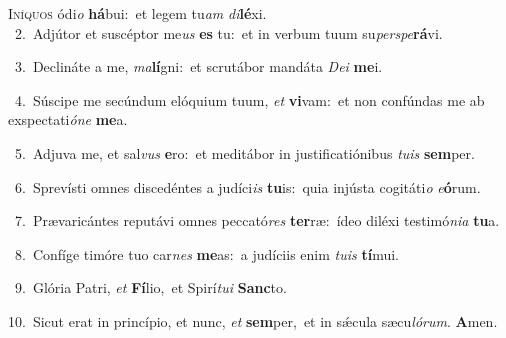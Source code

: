 \lettrine{\initial\textcolor{\initialcolor}{I}}{níquos} ódi\textit{o} \textbf{há}\-bui:~\star et legem tu\textit{am} \textit{di}\-\textbf{lé}xi.\\
{\numbfont\textcolor{\numbcolor}{~2.}}~Adjútor et suscéptor me\textit{us} \textbf{es} tu:~\star et in verbum tuum su\-\textit{per}\-\textit{spe}\textbf{rá}vi.\par
{\numbfont\textcolor{\numbcolor}{~3.}}~Declináte a me, \textit{ma}\-\textbf{lí}gni:~\star et scrutábor mandáta \textit{De}\-\textit{i} \textbf{me}\-i.\par
{\numbfont\textcolor{\numbcolor}{~4.}}~Súscipe me secúndum elóquium tuum, \textit{et} \textbf{vi}\-vam:~\star et non confúndas me ab exspectati\-\textit{ó}\-\textit{ne} \textbf{me}\-a.\par
{\numbfont\textcolor{\numbcolor}{~5.}}~Adjuva me, et sal\textit{vus} \textbf{e}\-ro:~\star et meditábor in justificatiónibus \textit{tu}\-\textit{is} \textbf{sem}\-per.\par
{\numbfont\textcolor{\numbcolor}{~6.}}~Sprevísti omnes discedéntes a judíci\textit{is} \textbf{tu}\-is:~\star quia injústa cogitáti\textit{o} \textit{e}\-\textbf{ó}rum.\par
{\numbfont\textcolor{\numbcolor}{~7.}}~Prævaricántes reputávi omnes peccató\textit{res} \textbf{ter}\-ræ:~\star ídeo diléxi testimó\-\textit{ni}\-\textit{a} \textbf{tu}\-a.\par
{\numbfont\textcolor{\numbcolor}{~8.}}~Confíge timóre tuo car\textit{nes} \textbf{me}\-as:~\star a judíciis enim \textit{tu}\-\textit{is} \textbf{tí}\-mui.\par
{\numbfont\textcolor{\numbcolor}{~9.}}~Glória Patri, \textit{et} \textbf{Fí}\-lio,~\star et Spirí\-\textit{tu}\-\textit{i} \textbf{Sanc}\-to.\par
{\numbfont\textcolor{\numbcolor}{10.}}~Sicut erat in princípio, et nunc, \textit{et} \textbf{sem}\-per,~\star et in sǽcula sæcu\-\textit{ló}\-\textit{rum}. \textbf{A}\-men.\par
